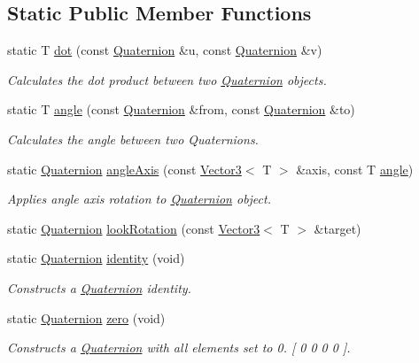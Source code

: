 \subsection*{Static Public Member Functions}
\begin{DoxyCompactItemize}
\item 
static T \hyperlink{classsparky_1_1_quaternion_aa8d99137f87577a3ecc0adca84e1cf5f}{dot} (const \hyperlink{classsparky_1_1_quaternion}{Quaternion} \&u, const \hyperlink{classsparky_1_1_quaternion}{Quaternion} \&v)
\begin{DoxyCompactList}\small\item\em Calculates the dot product between two \hyperlink{classsparky_1_1_quaternion}{Quaternion} objects. \end{DoxyCompactList}\item 
static T \hyperlink{classsparky_1_1_quaternion_a4b126de0d75143f88847b55e6d494d94}{angle} (const \hyperlink{classsparky_1_1_quaternion}{Quaternion} \&from, const \hyperlink{classsparky_1_1_quaternion}{Quaternion} \&to)
\begin{DoxyCompactList}\small\item\em Calculates the angle between two Quaternions. \end{DoxyCompactList}\item 
static \hyperlink{classsparky_1_1_quaternion}{Quaternion} \hyperlink{classsparky_1_1_quaternion_a66ae7960536a332a5d2e133bb14bc5c5}{angle\+Axis} (const \hyperlink{classsparky_1_1_vector3}{Vector3}$<$ T $>$ \&axis, const T \hyperlink{classsparky_1_1_quaternion_a4b126de0d75143f88847b55e6d494d94}{angle})
\begin{DoxyCompactList}\small\item\em Applies angle axis rotation to \hyperlink{classsparky_1_1_quaternion}{Quaternion} object. \end{DoxyCompactList}\item 
static \hyperlink{classsparky_1_1_quaternion}{Quaternion} \hyperlink{classsparky_1_1_quaternion_afa753acf0bb39f61a54feea77f634b21}{look\+Rotation} (const \hyperlink{classsparky_1_1_vector3}{Vector3}$<$ T $>$ \&target)
\item 
static \hyperlink{classsparky_1_1_quaternion}{Quaternion} \hyperlink{classsparky_1_1_quaternion_a2fd5c76c0b803c4c07736fd425f288c5}{identity} (void)
\begin{DoxyCompactList}\small\item\em Constructs a \hyperlink{classsparky_1_1_quaternion}{Quaternion} identity. \end{DoxyCompactList}\item 
static \hyperlink{classsparky_1_1_quaternion}{Quaternion} \hyperlink{classsparky_1_1_quaternion_a9016d778ae47df9c4800cf940a6a9fa4}{zero} (void)
\begin{DoxyCompactList}\small\item\em Constructs a \hyperlink{classsparky_1_1_quaternion}{Quaternion} with all elements set to 0. \mbox{[} 0 0 0 0 \mbox{]}. \end{DoxyCompactList}\end{DoxyCompactItemize}
